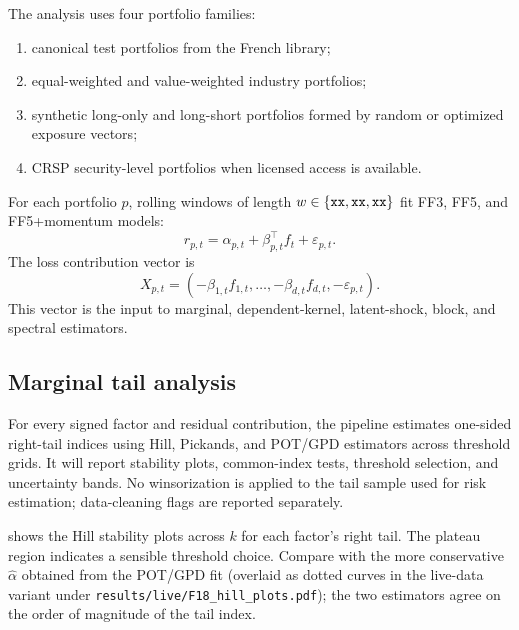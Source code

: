 The analysis uses four portfolio families:
\begin{enumerate}
\item canonical test portfolios from the French library;
\item equal-weighted and value-weighted industry portfolios;
\item synthetic long-only and long-short portfolios formed by random or
optimized exposure vectors;
\item CRSP security-level portfolios when licensed access is available.
\end{enumerate}
For each portfolio \(p\), rolling windows of length \(w\in\{\xx,\xx,\xx\}\)
fit FF3, FF5, and FF5+momentum models:
\[
  r_{p,t}=\alpha_{p,t}+\beta_{p,t}^\top f_t+\varepsilon_{p,t}.
\]
The loss contribution vector is
\[
  X_{p,t}=(-\beta_{1,t}f_{1,t},\ldots,-\beta_{d,t}f_{d,t},-\varepsilon_{p,t}).
\]
This vector is the input to marginal, dependent-kernel, latent-shock, block,
and spectral estimators.

\subsection{Marginal tail analysis}

For every signed factor and residual contribution, the pipeline estimates
one-sided right-tail indices using Hill, Pickands, and POT/GPD estimators
across threshold grids. It will report stability plots, common-index tests,
threshold selection, and uncertainty bands. No winsorization is applied to
the tail sample used for risk estimation; data-cleaning flags are reported
separately.

\begin{table}[p]
\centering

\caption[Real-data tail-index estimates]{Tail-index estimates for signed factor and residual contributions. Values are
\xx{} placeholders. The final table will report Hill, Pickands, and POT
estimates, selected thresholds, standard errors or bootstrap intervals, and
common-index diagnostic outcomes.}
\label{tab:tail-index-placeholder}
\end{table}



 shows the Hill stability plots across
$k$ for each factor's right tail. The plateau region indicates a
sensible threshold choice. Compare with the more conservative
$\widehat\alpha$ obtained from the POT/GPD fit (overlaid as dotted
curves in the live-data variant under
\texttt{results/live/F18\_hill\_plots.pdf}); the two estimators agree
on the order of magnitude of the tail index.

